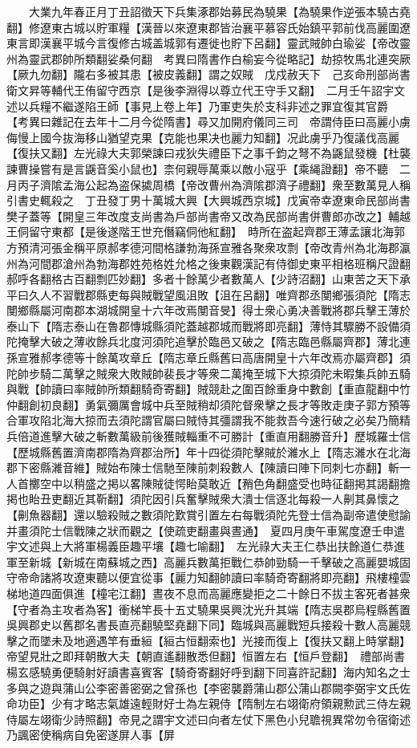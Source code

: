 　　大業九年春正月丁丑詔徵天下兵集涿郡始募民為驍果【為驍果作逆張本驍古堯翻】修遼東古城以貯軍糧【漢晉以來遼東郡皆治襄平慕容氏始鎮平郭前伐高麗圍遼東言即漢襄平城今言復修古城盖城郭有遷徙也貯下呂翻】靈武賊帥白瑜娑【帝改靈州為靈武郡帥所類翻娑桑何翻　考異曰隋書作白榆妄今從略記】劫掠牧馬北連突厥【厥九勿翻】隴右多被其患【被皮義翻】謂之奴賊　戊戍赦天下　己亥命刑部尚書衛文昇等輔代王侑留守西京【是後李淵得以尊立代王守手又翻】　二月壬午詔宇文述以兵糧不繼遂陷王師【事見上卷上年】乃軍吏失於支科非述之罪宜復其官爵　【考異曰雜記在去年十二月今從隋書】尋又加開府儀同三司　帝謂侍臣曰高麗小虜侮慢上國今抜海移山猶望克果【克能也果决也麗力知翻】况此虜乎乃復議伐高麗【復扶又翻】左光祿大夫郭榮諫曰戎狄失禮臣下之事千鈞之弩不為鼷鼠發機【杜襲諫曹操嘗有是言鼷音奚小鼠也】柰何親辱萬乘以敵小寇乎【乘䋲證翻】帝不聽　二月丙子濟隂孟海公起為盗保㨿周橋【帝改曹州為濟隂郡濟子禮翻】衆至數萬見人稱引書史輒殺之　丁丑發丁男十萬城大興【大興城西京城】戊寅帝幸遼東命民部尚書樊子蓋等【開皇三年改度支尚書為戶部尚書帝又改為民部尚書併曹郎亦改之】輔越王侗留守東都【是後遂階王世充僭竊侗他紅翻】　時所在盗起齊郡王薄孟讓北海郭方預清河張金稱平原郝孝德河間格謙勃海孫宣雅各聚衆攻剽【帝改青州為北海郡瀛州為河間郡滄州為勃海郡姓苑格姓允格之後東觀漢記有侍御史東平相格班稱尺證翻郝呼各翻格古百翻剽匹妙翻】多者十餘萬少者數萬人【少詩沼翻】山東苦之天下承平曰久人不習戰郡縣吏每與賊戰望風沮敗【沮在呂翻】唯齊郡丞閺鄉張須陀【隋志閺鄉縣屬河南郡本湖城開皇十六年改焉閺音旻】得士衆心勇决善戰將郡兵擊王薄於泰山下【隋志泰山在魯郡慱城縣須陀蓋越郡城而戰將即亮翻】薄恃其驟勝不設備須陀掩擊大破之薄收餘兵北度河須陀追擊於臨邑又破之【隋志臨邑縣屬齊郡】薄北連孫宣雅郝孝德等十餘萬攻章丘【隋志章丘縣舊曰高唐開皇十六年改焉亦屬齊郡】須陀帥步騎二萬擊之賊衆大敗賊帥裴長才等衆二萬掩至城下大掠須陀未暇集兵帥五騎與戰【帥讀曰率賊帥所類翻騎奇寄翻】賊競赴之圍百餘重身中數創【重直龍翻中竹仲翻創初良翻】勇氣彌厲會城中兵至賊稍却須陀督衆擊之長才等敗走庚子郭方預等合軍攻陷北海大掠而去須陀謂官屬曰賊恃其彊謂我不能救吾今速行破之必矣乃簡精兵倍道進擊大破之斬數萬級前後獲賊輜重不可勝計【重直用翻勝音升】歷城羅士信【歷城縣舊置濟南郡隋為齊郡治所】年十四從須陀擊賊於濰水上【隋志濰水在北海郡下密縣濰音維】賊始布陳士信馳至陳前刺殺數人【陳讀曰陣下同刺七亦翻】斬一人首擲空中以稍盛之掲以畧陳賊徒愕眙莫敢近【矟色角翻盛受也時征翻掲其謁翻擔掲也眙丑吏翻近其靳翻】須陀因引兵奮擊賊衆大潰士信逐北每殺一人劓其鼻懷之【劓魚器翻】還以驗殺賊之數須陀歎賞引置左右每戰須陀先登士信為副帝遣使慰諭并畫須陀士信戰陳之狀而觀之【使疏吏翻畫與晝通】　夏四月庚午車駕度遼壬申遣宇文述與上大將軍楊義臣趣平壤【趣七喻翻】　左光祿大夫王仁恭出扶餘道仁恭進軍至新城【新城在南蘇城之西】高麗兵數萬拒戰仁恭帥勁騎一千擊破之高麗嬰城固守帝命諸將攻遼東聽以便宜從事【麗力知翻帥讀曰率騎奇寄翻將即亮翻】飛樓橦雲梯地道四面俱進【橦宅江翻】晝夜不息而高麗應變拒之二十餘日不拔主客死者甚衆【守者為主攻者為客】衝梯竿長十五丈驍果吳興沈光升其端【隋志吳郡烏程縣舊置吳興郡史以舊郡名書長直亮翻驍堅堯翻下同】臨城與高麗戰短兵接殺十數人高麗競擊之而墜未及地適遇竿有垂絙【絙古恒翻索也】光接而復上【復扶又翻上時掌翻】帝望見壯之即拜朝散大夫【朝直遙翻散悉但翻】恒置左右【恒戶登翻】　禮部尚書楊玄感驍勇便騎射好讀書喜賓客【騎奇寄翻好呼到翻下同喜許記翻】海内知名之士多與之遊與蒲山公李密善密弼之曾孫也【李密襲爵蒲山郡公蒲山郡闕李弼宇文氏佐命功臣】少有才略志氣雄遠輕財好士為左親侍【隋制左右翊衛府領親勲武三侍左親侍屬左翊衛少詩照翻】帝見之謂宇文述曰向者左仗下黑色小兒聸視異常勿令宿衛述乃諷密使稱病自免密遂屏人事【屏
